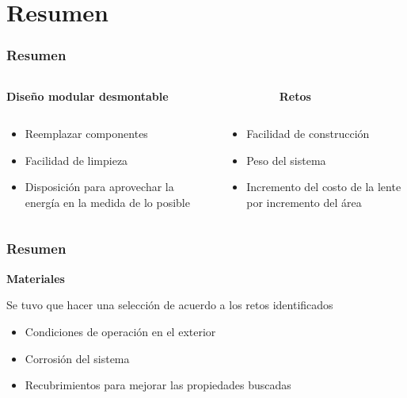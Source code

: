 \section{Resumen}

\begin{frame}
	\frametitle{Resumen}
	
	\begin{columns}
		\begin{column}{0.5\linewidth}
			\textbf{Diseño modular desmontable}
		\end{column}
		\begin{column}{0.5\linewidth}
			\textbf{Retos}
		\end{column}
	\end{columns}
	
	\begin{columns}
		\begin{column}{0.5\linewidth}
			\begin{itemize}
				\item Reemplazar componentes
				\item Facilidad de limpieza
				\item Disposición para aprovechar la energía en la medida de lo posible
			\end{itemize}
		\end{column}
		\begin{column}{0.5\linewidth}
			\begin{itemize}
				\item Facilidad de construcción
				\item Peso del sistema
				\item Incremento del costo de la lente por incremento del área
			\end{itemize}
		\end{column}
	\end{columns}
\end{frame}


\begin{frame}
	\frametitle{Resumen}
	\begin{center}
		\textbf{Materiales}
	\end{center}
	
	Se tuvo que hacer una selección de acuerdo a los retos identificados
	\begin{itemize}
		\item Condiciones de operación en el exterior
		\item Corrosión del sistema
		\item Recubrimientos para mejorar las propiedades buscadas
	\end{itemize}
\end{frame}